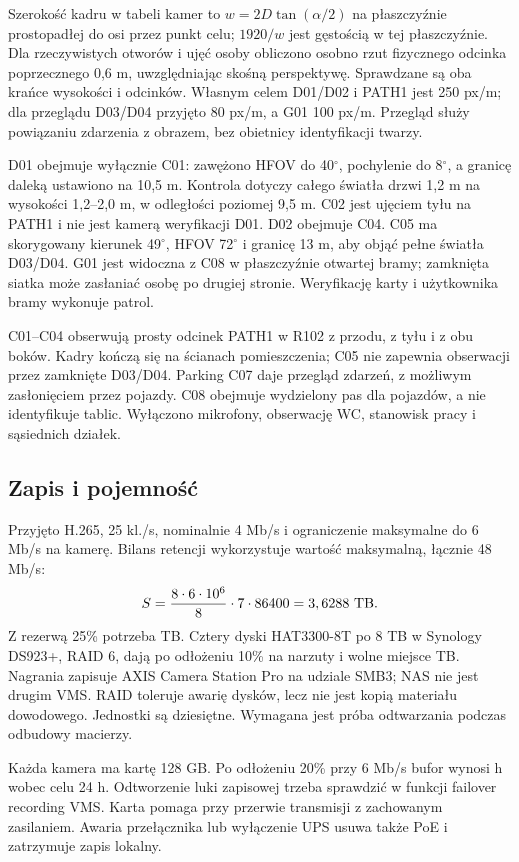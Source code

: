 \OpticsTable

Szerokość kadru w tabeli kamer to $w=2D\tan(\alpha/2)$ na płaszczyźnie prostopadłej do osi przez punkt celu; $1920/w$ jest gęstością w tej płaszczyźnie. Dla rzeczywistych otworów i ujęć osoby obliczono osobno rzut fizycznego odcinka poprzecznego 0,6 m, uwzględniając skośną perspektywę. Sprawdzane są oba krańce wysokości i odcinków. Własnym celem D01/D02 i PATH1 jest 250 px/m; dla przeglądu D03/D04 przyjęto 80 px/m, a G01 100 px/m. Przegląd służy powiązaniu zdarzenia z obrazem, bez obietnicy identyfikacji twarzy.

\OpticalVerificationTable

D01 obejmuje wyłącznie C01: zawężono HFOV do 40$^\circ$, pochylenie do 8$^\circ$, a granicę daleką ustawiono na 10,5 m. Kontrola dotyczy całego światła drzwi 1,2 m na wysokości 1,2--2,0 m, w odległości poziomej 9,5 m. C02 jest ujęciem tyłu na PATH1 i nie jest kamerą weryfikacji D01. D02 obejmuje C04. C05 ma skorygowany kierunek 49$^\circ$, HFOV 72$^\circ$ i granicę 13 m, aby objąć pełne światła D03/D04. G01 jest widoczna z C08 w płaszczyźnie otwartej bramy; zamknięta siatka może zasłaniać osobę po drugiej stronie. Weryfikację karty i użytkownika bramy wykonuje patrol.

C01--C04 obserwują prosty odcinek PATH1 w R102 z przodu, z tyłu i z obu boków. Kadry kończą się na ścianach pomieszczenia; C05 nie zapewnia obserwacji przez zamknięte D03/D04. Parking C07 daje przegląd zdarzeń, z możliwym zasłonięciem przez pojazdy. C08 obejmuje wydzielony pas dla pojazdów, a nie identyfikuje tablic. Wyłączono mikrofony, obserwację WC, stanowisk pracy i sąsiednich działek.\cite{S-AOA,L-GDPR}

\subsection*{Zapis i pojemność}
Przyjęto H.265, 25 kl./s, nominalnie 4 Mb/s i ograniczenie maksymalne do 6 Mb/s na kamerę. Bilans retencji wykorzystuje wartość maksymalną, łącznie 48 Mb/s:
\[
S=\frac{8\cdot6\cdot10^6}{8}\cdot7\cdot86400
=3,6288{}\ \mathrm{TB}.
\]
Z rezerwą 25\% potrzeba \StorageNeed{} TB. Cztery dyski HAT3300-8T po 8 TB w Synology DS923+, RAID 6, dają po odłożeniu 10\% na narzuty i wolne miejsce \StorageHave{} TB. Nagrania zapisuje AXIS Camera Station Pro na udziale SMB3; NAS nie jest drugim VMS. RAID toleruje awarię dysków, lecz nie jest kopią materiału dowodowego. Jednostki są dziesiętne. Wymagana jest próba odtwarzania podczas odbudowy macierzy.\cite{S-NAS,S-VMS}

Każda kamera ma kartę 128 GB. Po odłożeniu 20\% przy 6 Mb/s bufor wynosi \SDHours{} h wobec celu 24 h. Odtworzenie luki zapisowej trzeba sprawdzić w funkcji failover recording VMS. Karta pomaga przy przerwie transmisji z zachowanym zasilaniem. Awaria przełącznika lub wyłączenie UPS usuwa także PoE i zatrzymuje zapis lokalny.
